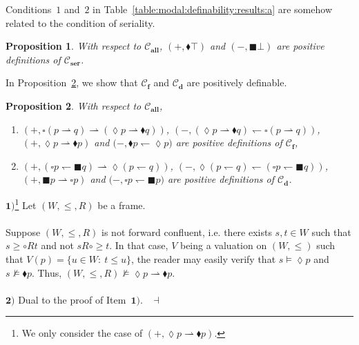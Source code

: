 \documentclass[draft]{article}
\newtheorem{proposition}{Proposition}
\newenvironment{proof}{{\bf Proof:}}{~$\dashv$\\}
\def\allfra{\mathbf{all}}
\def\fcfra{\mathbf{f}}
\def\serial{\mathbf{ser}}
\def\dcfra{\mathbf{d}}
\begin{document}
%
%
Conditions~$1$ and~$2$ in Table~\ref{table:modal:definability:results:a} are somehow related to the condition of seriality.
%
%
\begin{proposition}\label{proposition:positive:definition:seriality}
%
%
With respect to ${\mathcal C}_{\allfra}$, $(+,{\blacklozenge}{\top})$ and $(-,{\blacksquare}{\bot})$ are positive definitions of ${\mathcal C}_{\serial}$.
%
%
\end{proposition}
%
%
%
%
In Proposition~\ref{Proposition:forward:confluence:is:modally:definable}, we show that ${\mathcal C}_{\fcfra}$ and ${\mathcal C}_{\dcfra}$ are positively definable.
%
%
\begin{proposition}\label{Proposition:forward:confluence:is:modally:definable}
%
%
With respect to ${\mathcal C}_{\allfra}$,
%
%
\begin{enumerate}
%
%
\item $(+,{\square}(p{\rightharpoonup}q){\rightharpoonup}({\lozenge}p{\rightharpoonup}{\blacklozenge}q))$, $(-,({\lozenge}p{\rightharpoonup}{\blacklozenge}q){\leftharpoondown}{\square}(p{\rightharpoonup}q))$, $(+,{\lozenge}p{\rightharpoonup}{\blacklozenge}p)$ and $(-,
%
%
%
%
%
%
%
$\linebreak$
%
%
%
%
%
%
{\blacklozenge}p{\leftharpoondown}{\lozenge}p)$ are positive definitions of ${\mathcal C}_{\fcfra}$,
%
%
\item $(+,({\square}p{\leftharpoondown}{\blacksquare}q){\rightharpoonup}{\lozenge}(p{\leftharpoondown}q))$, $(-,{\lozenge}(p{\leftharpoondown}q){\leftharpoondown}({\square}p{\leftharpoondown}{\blacksquare}q))$, $(+,{\blacksquare}p{\rightharpoonup}{\square}p)$ and $(-,
%
%
%
%
%
%
%
$\linebreak$
%
%
%
%
%
%
{\square}p{\leftharpoondown}{\blacksquare}p)$ are positive definitions of ${\mathcal C}_{\dcfra}$.
%
%
\end{enumerate}
%
%
\end{proposition}
%
%
\begin{proof}
%
%
$\mathbf{1)}$\footnote{We only consider the case of $(+,{\lozenge}p{\rightharpoonup}{\blacklozenge}p)$.}
%
%
Let $(W,{\leq},{R})$ be a frame.
%
%
\\
\\
%
%
%
%
%
%
%
Suppose $(W,{\leq},{R})$ is not forward confluent, i.e. there exists $s,t{\in}W$ such that $s{\geq}{\circ}{R}t$ and not $s{R}{\circ}{\geq}t$.
In that case, $V$ being a valuation on $(W,{\leq})$ such that $V(p){=}\{u{\in}W:\ t{\leq}u\}$,
the reader may easily verify that $s{\models}{\lozenge}p$ and $s{\not\models}{\blacklozenge}p$.
Thus, $(W,{\leq},{R}){\not\models}{\lozenge}p{\rightharpoonup}{\blacklozenge}p$.
%
%
\\
\\
%
%
$\mathbf{2)}$ Dual to the proof of Item~$\mathbf{1)}$.
%
%
\medskip
%
%
\end{proof}
\end{document}
